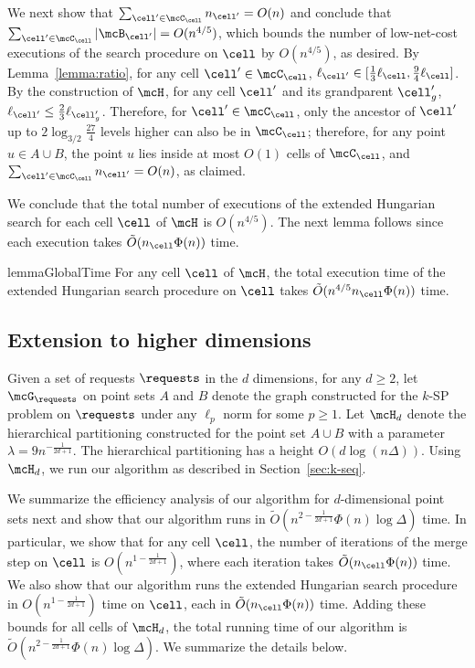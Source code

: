 We next show that $\sum_{\cell'\in\mcC_{\cell}}n_{\cell'}=O(n)$ and conclude that $\sum_{\cell'\in\mcC_\cell}|\mcB_{\cell'}| = O(n^{4/5})$, which bounds the number of low-net-cost executions of the search procedure on $\cell$ by $O(n^{4/5})$, as desired.
By Lemma~\ref{lemma:ratio}, for any cell $\cell'\in\mcC_{\cell}$, $\ell_{\cell'}\in[\frac{1}{3}\ell_\cell, \frac{9}{4}\ell_\cell]$. By the construction of $\mcH$, for any cell $\cell'$ and its grandparent $\cell'_g$, $\ell_{\cell'}\le \frac{2}{3}\ell_{\cell'_g}$. Therefore, for $\cell'\in \mcC_\cell$, only the ancestor of $\cell'$ up to $2\log_{3/2} \frac{27}{4}$ levels higher can also be in $\mcC_\cell$; therefore, for any point $u\in A\cup B$, the point $u$ lies inside at most $O(1)$ cells of $\mcC_\cell$, and $\sum_{\cell'\in\mcC_{\cell}}n_{\cell'}=O(n)$, as claimed.

We conclude that the total number of executions of the extended Hungarian search for each cell $\cell$ of $\mcH$ is $O(n^{4/5})$. The next lemma follows since each execution takes $\tilde{O}(n_\cell\Phi(n))$ time.
\begin{restatable}{lemma}{GlobalTime}\label{lemma:global-time}
    For any cell $\cell$ of $\mcH$, the total execution time of the extended Hungarian search procedure on $\cell$ takes $\tilde{O}(n^{4/5}n_\cell\Phi(n))$ time.
\end{restatable}











\subsection{Extension to higher dimensions}\label{sec:appendix-high-d-ksp}
Given a set of requests $\requests$ in the $d$ dimensions, for any $d\ge 2$, let $\mcG_\requests$ on point sets $A$ and $B$ denote the graph constructed for the $k$-SP problem on $\requests$ under any $\ell_p$ norm for some $p\ge 1$. Let $\mcH_d$ denote the hierarchical partitioning constructed for the point set $A\cup B$ with a parameter $\lambda = 9n^{-\frac{1}{2d+1}}$. 
The hierarchical partitioning has a height $O(d\log(n\Delta))$. Using $\mcH_d$, we run our algorithm as described in Section~\ref{sec:k-seq}. 

We summarize the efficiency analysis of our algorithm for $d$-dimensional point sets next and show that our algorithm runs in $\tilde{O}(n^{2-\frac{1}{2d+1}}\Phi(n)\log \Delta)$ time. In particular, we show that for any cell $\cell$, the number of iterations of the merge step on $\cell$ is $O(n^{1-\frac{1}{2d+1}})$, where each iteration takes $\tilde{O}(n_\cell\Phi(n))$ time. We also show that our algorithm runs the extended Hungarian search procedure in $O(n^{1-\frac{1}{2d+1}})$ time on $\cell$, each in $\tilde{O}(n_\cell\Phi(n))$ time. Adding these bounds for all cells of $\mcH_d$, the total running time of our algorithm is $\tilde{O}(n^{2-\frac{1}{2d+1}}\Phi(n)\log\Delta)$. We summarize the details below.

